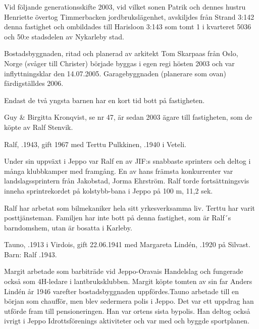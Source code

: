 Vid följande generationsskifte 2003, vid vilket sonen Patrik och dennes hustru Henriette övertog Timmerbacken jordbrukslägenhet, avskiljdes från Strand 3:142 denna fastighet och ombildades till	Harisloon 3:143 som tomt 1 i kvarteret 5036 och 50:e stadsdelen av	Nykarleby stad.

Bostadsbyggnaden, ritad och planerad av arkitekt Tom Skarpaas	från Oslo, Norge (svåger till Christer) började byggas i egen regi hösten 2003 och var inflyttningsklar den 14.07.2005. Garagebyggnaden (planerare som ovan) färdigställdes 2006.

Endast de två yngsta barnen har en kort tid bott på fastigheten.


Guy \& Birgitta Kronqvist, se nr 47, är sedan 2003 ägare till fastigheten, som de köpte av Ralf Stenvik.




Ralf, .1943, gift 1967 med Terttu Pulkkinen, .1940 i Veteli.
\begin{jhchildren}
  \item {}
  \item {}
\end{jhchildren}
Under sin uppväxt i Jeppo var Ralf en av JIF:s snabbaste sprinters och deltog i många klubbkamper med framgång. En av hans främsta konkurrenter var landslagssprintern från Jakobstad, Jorma Ehrström. Ralf torde fortsättningsvis inneha sprintrekordet på kolstybb-bana i Jeppo på 100 m, 11,2 sek.

Ralf har arbetat som bilmekaniker hela sitt yrkesverksamma liv. Terttu har varit posttjänsteman. Familjen har inte bott på denna fastighet, som är Ralf´s barndomshem, utan är bosatta i Karleby.


Tauno, .1913 i Virdois, gift 22.06.1941 med  Margareta Lindén, .1920 på Silvast.
Barn: Ralf .1943.

Margit arbetade som barbiträde vid Jeppo-Oravais Handelslag och fungerade också som 4H-ledare i lantbruksklubben. Margit köpte tomten av sin far Anders Lindén år 1946 varefter bostadsbyggnaden uppfördes.Tauno arbetade till en början som chaufför, men blev sedermera polis i Jeppo. Det var ett uppdrag han utförde fram till pensioneringen. Han var ortens sista bypolis. Han deltog också ivrigt i Jeppo  Idrottsförenings aktiviteter och var med och byggde sportplanen.

